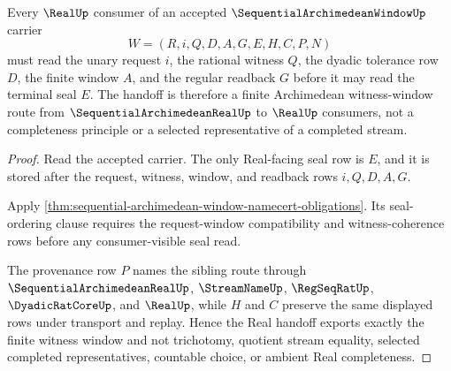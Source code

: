\begin{theorem}
\label{thm:sequential-archimedean-window-real-handoff}
Every $\RealUp$ consumer of an accepted $\SequentialArchimedeanWindowUp$ carrier
$$
W=(R,i,Q,D,A,G,E,H,C,P,N)
$$
must read the unary request $i$, the rational witness $Q$, the dyadic tolerance row $D$, the finite window $A$, and the regular readback $G$ before it may read the terminal seal $E$. The handoff is therefore a finite Archimedean witness-window route from $\SequentialArchimedeanRealUp$ to $\RealUp$ consumers, not a completeness principle or a selected representative of a completed stream.
\end{theorem}
\begin{proof}
Read the accepted carrier. The only Real-facing seal row is $E$, and it is stored after the request, witness, window, and readback rows $i,Q,D,A,G$.

Apply \autoref{thm:sequential-archimedean-window-namecert-obligations}. Its seal-ordering clause requires the request-window compatibility and witness-coherence rows before any consumer-visible seal read.

The provenance row $P$ names the sibling route through $\SequentialArchimedeanRealUp$, $\StreamNameUp$, $\RegSeqRatUp$, $\DyadicRatCoreUp$, and $\RealUp$, while $H$ and $C$ preserve the same displayed rows under transport and replay. Hence the Real handoff exports exactly the finite witness window and not trichotomy, quotient stream equality, selected completed representatives, countable choice, or ambient Real completeness.
\end{proof}



